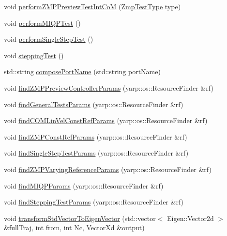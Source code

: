 \begin{DoxyCompactItemize}
\item 
void \hyperlink{classWalkingClient_a02b25446423fa7457a20dce6fe224534}{perform\-Z\-M\-P\-Preview\-Test\-Int\-Co\-M} (\hyperlink{utils_8h_afc01479a47f5a87462a54b6a9e11fffa}{\-Zmp\-Test\-Type} type)
\item 
void \hyperlink{classWalkingClient_a4f14aa5a6f0219f80fba6573889b8bb7}{perform\-M\-I\-Q\-P\-Test} ()
\item 
void \hyperlink{classWalkingClient_a49fb64ddafa81f0a5f29a8c0fc5188bd}{perform\-Single\-Step\-Test} ()
\item 
void \hyperlink{classWalkingClient_adb2fbd66671321d046cf5e1ca74f5bc1}{stepping\-Test} ()
\item 
std\-::string \hyperlink{classWalkingClient_ae8f7dc629313df7d362e3edd6f45ae10}{compose\-Port\-Name} (std\-::string port\-Name)
\item 
void \hyperlink{classWalkingClient_acd9cf6d2c9a140f789437882d781d963}{find\-Z\-M\-P\-Preview\-Controller\-Params} (yarp\-::os\-::\-Resource\-Finder \&rf)
\item 
void \hyperlink{classWalkingClient_ab94cb8266e45f49e51396458df7f8708}{find\-General\-Tests\-Params} (yarp\-::os\-::\-Resource\-Finder \&rf)
\item 
void \hyperlink{classWalkingClient_a2a7372e6cad46efd380eb85e7547cf4e}{find\-C\-O\-M\-Lin\-Vel\-Const\-Ref\-Params} (yarp\-::os\-::\-Resource\-Finder \&rf)
\item 
void \hyperlink{classWalkingClient_ad8eb137c03025ce04cedd4eea58f7a6d}{find\-Z\-M\-P\-Const\-Ref\-Params} (yarp\-::os\-::\-Resource\-Finder \&rf)
\item 
void \hyperlink{classWalkingClient_a48e8e823e0a76a662722e05f6bd803e3}{find\-Single\-Step\-Test\-Params} (yarp\-::os\-::\-Resource\-Finder \&rf)
\item 
void \hyperlink{classWalkingClient_a6b8f21532c8207ec95b64f6548c3b6b1}{find\-Z\-M\-P\-Varying\-Reference\-Params} (yarp\-::os\-::\-Resource\-Finder \&rf)
\item 
void \hyperlink{classWalkingClient_accdb497fc22b293095290f3d63d5cf72}{find\-M\-I\-Q\-P\-Params} (yarp\-::os\-::\-Resource\-Finder \&rf)
\item 
void \hyperlink{classWalkingClient_af0f47f61db149b0beabb516f4f244dfc}{find\-Stepping\-Test\-Params} (yarp\-::os\-::\-Resource\-Finder \&rf)
\item 
void \hyperlink{classWalkingClient_ab4148804702e065310a903112bc10162}{transform\-Std\-Vector\-To\-Eigen\-Vector} (std\-::vector$<$ \-Eigen\-::\-Vector2d $>$ \&full\-Traj, int from, int \-Nc, \-Vector\-Xd \&output)

\end{DoxyCompactItemize}
